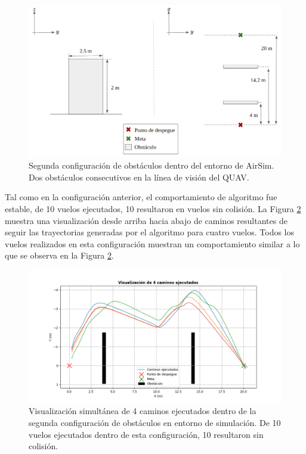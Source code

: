 \begin{figure}[H]
    \centering
    \includegraphics[scale=0.35]{partes/img/config-2-double.png}
    \caption[Segunda configuración de obstáculos dentro del entorno de AirSim.]{Segunda configuración de obstáculos dentro del entorno de AirSim. Dos obstáculos consecutivos en la línea de visión del QUAV.}
    \label{fig:config-2-double}
\end{figure}

Tal como en la configuración anterior, el comportamiento de algoritmo fue estable, de 10 vuelos ejecutados, 10 resultaron en vuelos sin colisión. La Figura \ref{fig:double-graph-4} muestra una visualización desde arriba hacia abajo de caminos resultantes de seguir las trayectorias generadas por el algoritmo para cuatro vuelos. Todos los vuelos realizados en esta configuración muestran un comportamiento similar a lo que se observa en la Figura \ref{fig:double-graph-4}.

\begin{figure}[H]
    \centering
    \includegraphics[scale=0.5]{partes/img/sim-double-panel-graph-4.png}
    \caption[Visualización simultánea de 4 caminos ejecutados dentro de la segunda configuración de obstáculos en entorno de simulación.]{Visualización simultánea de 4 caminos ejecutados dentro de la segunda configuración de obstáculos en entorno de simulación. De 10 vuelos ejecutados dentro de esta configuración, 10 resultaron sin colisión.}
    \label{fig:double-graph-4}
\end{figure}

